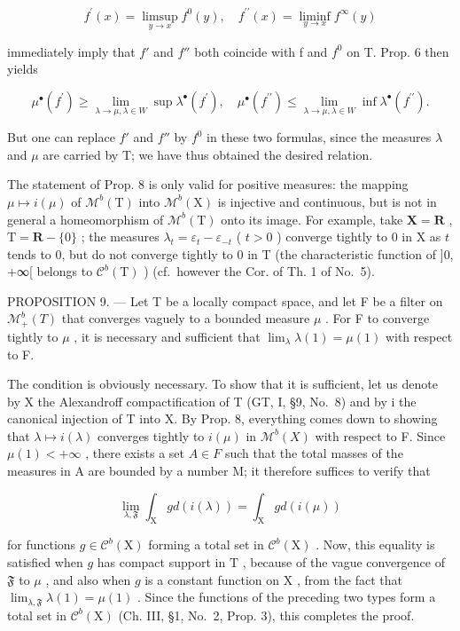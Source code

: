 \[
f ^ {\prime} (x) = \limsup _ {y \to x} f ^ {0} (y), \quad f ^ {\prime \prime} (x) = \liminf _ {y \to x} f ^ {\infty} (y)
\]

immediately imply that \(f'\) and \(f''\) both coincide with f and \(f^{0}\) on T. Prop. 6 then yields

\[
\mu^ {\bullet} (f ^ {\prime}) \geqslant \lim _ {\lambda \to \mu ,   \lambda \in W} \sup \lambda^ {\bullet} (f ^ {\prime})  , \quad \mu^ {\bullet} (f ^ {\prime \prime}) \leqslant \lim _ {\lambda \to \mu ,   \lambda \in W} \inf \lambda^ {\bullet} (f ^ {\prime \prime})  .
\]

But one can replace \(f'\) and \(f''\) by \(f^{0}\) in these two formulas, since the measures \(\lambda\) and \(\mu\) are carried by T; we have thus obtained the desired relation.

The statement of Prop. 8 is only valid for positive measures: the mapping \(\mu \mapsto i(\mu)\) of \(\mathcal{M}^b (\mathrm{T})\) into \(\mathcal{M}^b (\mathrm{X})\) is injective and continuous, but is not in general a homeomorphism of \(\mathcal{M}^b (\mathrm{T})\) onto its image. For example, take \(\mathbf{X} = \mathbf{R}\) , \(\mathrm{T} = \mathbf{R} - \{0\}\) ; the measures \(\lambda_t = \varepsilon_t - \varepsilon_{-t}\) ( \(t > 0\) ) converge tightly to 0 in X as \(t\) tends to 0, but do not converge tightly to 0 in T (the characteristic function of {]}0, +∞{[} belongs to \(\mathcal{C}^b (\mathrm{T})\) ) (cf.~however the Cor. of Th. 1 of No.~5).

PROPOSITION 9. --- Let T be a locally compact space, and let F be a filter on \(\mathcal{M}_{+}^{b}(T)\) that converges vaguely to a bounded measure \(\mu\) . For F to converge tightly to \(\mu\) , it is necessary and sufficient that \(\lim_{\lambda}\lambda(1)=\mu(1)\) with respect to F.

The condition is obviously necessary. To show that it is sufficient, let us denote by X the Alexandroff compactification of T (GT, I, §9, No.~8) and by i the canonical injection of T into X. By Prop. 8, everything comes down to showing that \(\lambda \mapsto i(\lambda)\) converges tightly to \(i(\mu)\) in \(\mathcal{M}^{b}(X)\) with respect to F. Since \(\mu(1) < +\infty\) , there exists a set \(A \in F\) such that the total masses of the measures in A are bounded by a number M; it therefore suffices to verify that

\[
\lim _ {\lambda , \mathfrak {F}} \int_ {\mathrm{X}} g d (i (\lambda)) = \int_ {\mathrm{X}} g d (i (\mu))\tag{5}
\]

for functions \(g \in \mathcal{C}^b(\mathrm{X})\) forming a total set in \(\mathcal{C}^b(\mathrm{X})\) . Now, this equality is satisfied when \(g\) has compact support in \(\mathrm{T}\) , because of the vague convergence of \(\mathfrak{F}\) to \(\mu\) , and also when \(g\) is a constant function on \(\mathrm{X}\) , from the fact that \(\lim_{\lambda, \mathfrak{F}} \lambda(1) = \mu(1)\) . Since the functions of the preceding two types form a total set in \(\mathcal{C}^b(\mathrm{X})\) (Ch. III, §1, No.~2, Prop. 3), this completes the proof.

